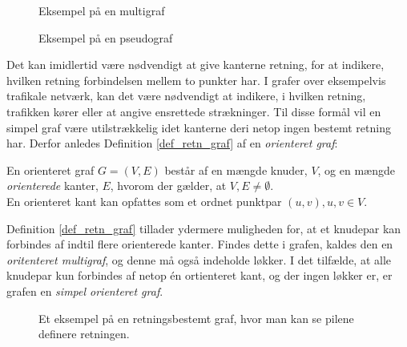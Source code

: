 \begin{figure}[!htb]
   \begin{minipage}{0.48\textwidth}
     \centering
     
     \caption{Eksempel på en multigraf}\label{Fig:Data1}
   \end{minipage}\hfill
   \begin{minipage}{0.48\textwidth}
     \centering
     
     \caption{Eksempel på en pseudograf}\label{Fig:Data2}
   \end{minipage}
\end{figure}


\noindent Det kan imidlertid være nødvendigt at give kanterne retning, for at indikere, hvilken retning forbindelsen mellem to punkter har. I grafer over eksempelvis trafikale netværk, kan det være nødvendigt at indikere, i hvilken retning, trafikken kører eller at angive ensrettede strækninger. Til disse formål vil en simpel graf være utilstrækkelig idet kanterne deri netop ingen bestemt retning har. Derfor anledes Definition \ref{def_retn_graf} 
af en \textit{orienteret graf}:

\begin{defn}
En orienteret graf $G = (V, E)$ består af en mængde knuder, $V$, og en mængde \textit{orienterede} kanter, $E$, hvorom der gælder, at $V, E \neq \emptyset$.\\
En orienteret kant kan opfattes som et ordnet punktpar $(u,v), u,v \in  V$.
\label{def_retn_graf}
\end{defn} 

\noindent Definition \ref{def_retn_graf} tillader ydermere muligheden for, at et knudepar kan forbindes af indtil flere orienterede kanter. Findes dette i grafen, kaldes den en \textit{oritenteret multigraf}, og denne må også indeholde løkker. I det tilfælde, at alle knudepar kun forbindes af netop én ortienteret kant, og der ingen løkker er, er grafen en \textit{simpel orienteret graf}.

\begin{figure}[h]
\centering
\caption{Et eksempel på en retningsbestemt graf, hvor man kan se pilene definere retningen.}
\end{figure}

